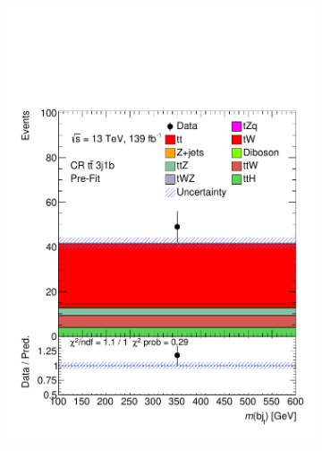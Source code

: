 \begin{figure}[!h]
\begin{subfigure}[b]{0.33\linewidth}
    \includegraphics[width=\textwidth]{ubonn-thesis/Chapters/Chapters_08/appendix/data/CR_3j1b.pdf} 
    \caption{}
  \end{subfigure}%
  \newline
  \hspace*{-1.5cm}
  \begin{subfigure}[b]{0.33\linewidth}

\end{subfigure}
\end{figure}

